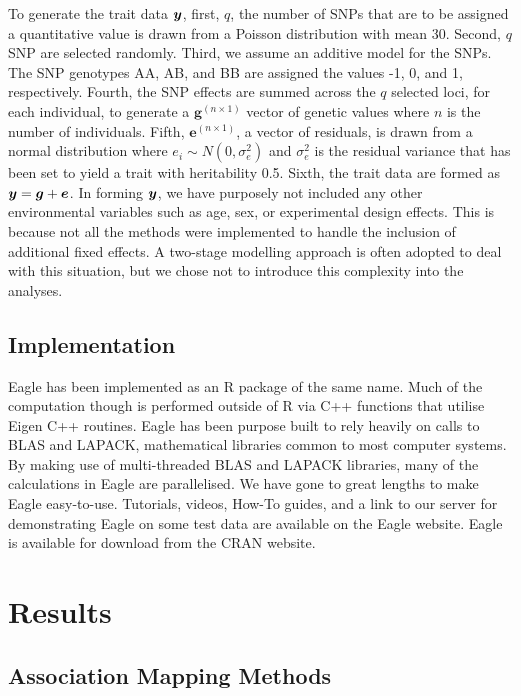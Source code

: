 \documentclass{article}
\begin{document}
To generate the trait data $\bm{y}$, first, $q$, the number of SNPs that are to be assigned a quantitative value is drawn from a Poisson distribution with 
mean 30. Second, $q$ SNP are selected randomly. Third, we assume an additive model for the SNPs. The SNP genotypes AA, AB, and BB 
are assigned the values -1, 0, and 1, respectively. Fourth, the SNP effects are summed across the $q$ selected loci, for each individual, to 
generate a $\bm{g}^{(n \times 1)}$ vector of genetic values where $n$ is the number of individuals. 
Fifth, $\bm{e}^{(n \times 1)}$, a vector of residuals, is drawn from a normal distribution where $e_i \sim N(0, \sigma^2_e)$ and $\sigma^2_e$ is 
the residual variance that has been set to yield a trait with heritability 0.5. Sixth,  the trait data are formed as $\bm{y} =  \bm{g} + \bm{e}$.  
In forming $\bm{y}$, we have purposely not included any other environmental variables such as age, sex, or experimental design effects. This is because 
not all the methods were implemented to handle the inclusion of additional fixed effects. A two-stage modelling approach 
is often adopted to deal with this situation, but we chose not to introduce this complexity into the analyses.  



\subsection{Implementation}

Eagle has been implemented as an R package of the same name. Much of the computation though is performed outside of R 
via C++ functions that utilise Eigen C++ routines. Eagle has been purpose built to rely heavily on calls to BLAS and LAPACK, 
mathematical libraries common to most computer systems. By making use of multi-threaded  BLAS and LAPACK libraries, many of the 
calculations in Eagle are parallelised. We have gone to great lengths to make Eagle easy-to-use. Tutorials, videos, How-To guides, and 
a link to our server for demonstrating Eagle on some test data are available on the Eagle website. Eagle is available for download from the CRAN website. 

  
  

\section{Results}

\subsection{Association Mapping Methods}
\end{document}
